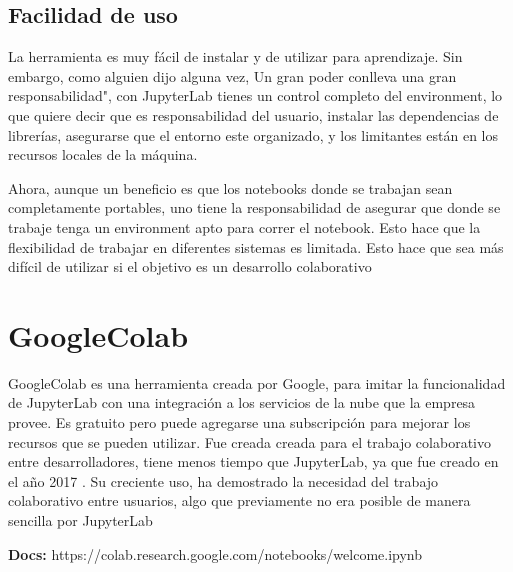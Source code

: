 \documentclass[a4paper,12pt]{article}
\begin{document}
\subsection{Facilidad de uso}
La herramienta es muy fácil de instalar y de utilizar para aprendizaje. Sin
embargo, como alguien dijo alguna vez, \textquotedbl Un gran poder conlleva una gran
responsabilidad", con JupyterLab tienes un control completo del environment, lo
que quiere decir que es responsabilidad del usuario, instalar las dependencias
de librerías, asegurarse que el entorno este organizado, y los limitantes están
en los recursos locales de la máquina.\cite{perkel2018jupyter}

Ahora, aunque un beneficio es que los notebooks donde se trabajan sean
completamente portables, uno tiene la responsabilidad de asegurar que donde se
trabaje tenga un environment apto para correr el notebook. Esto hace que la
flexibilidad de trabajar en diferentes sistemas es limitada. Esto hace que sea
más difícil de utilizar si el objetivo es un desarrollo colaborativo

\section{GoogleColab}

GoogleColab es una herramienta creada por Google, para imitar la funcionalidad
de JupyterLab con una integración a los servicios de la nube que la empresa
provee. Es gratuito pero puede agregarse una
subscripción para mejorar los recursos que se pueden utilizar. Fue creada
creada para el trabajo colaborativo entre desarrolladores, tiene
menos tiempo que JupyterLab, ya que fue creado en el año 2017 \cite{colab_faqs}.
Su creciente uso, ha demostrado la necesidad del trabajo colaborativo entre
usuarios, algo que previamente no era posible de manera sencilla por JupyterLab
\cite{reddit2021}

\textbf{Docs:} https://colab.research.google.com/notebooks/welcome.ipynb\cite{google_colab_docs}
\end{document}
